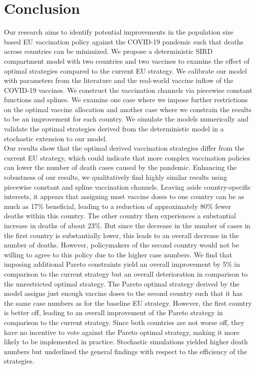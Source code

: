 \section{Conclusion}
Our research aims to identify potential improvements in the population size based EU vaccination policy against the COVID-19 pandemic such that deaths across countries can be minimized. We propose a deterministic SIRD compartment model with two countries and two vaccines to examine the effect of optimal strategies compared to the current EU strategy. We calibrate our model with parameters from the literature and the real-world vaccine inflow of the COVID-19 vaccines. We construct the vaccination channels via piecewise constant functions and splines. We examine one case where we impose further restrictions on the optimal vaccine allocation and another case where we constrain the results to be an improvement for each country. We simulate the models numerically and validate the optimal strategies derived from the deterministic model in a stochastic extension to our model.\\

Our results show that the optimal derived vaccination strategies differ from the current EU strategy, which could indicate that more complex vaccination policies can lower the number of death cases caused by the pandemic. Enhancing the robustness of our results, we qualitatively find highly similar results using piecewise constant and spline vaccination channels. Leaving aside country-specific interests, it appears that assigning most vaccine doses to one country can be as much as 17\% beneficial, leading to a reduction of approximately 80\% fewer deaths within this country. The other country then experiences a substantial increase in deaths of about 23\%. But since the decrease in the number of cases in the first country is substantially lower, this leads to an overall decrease in the number of deaths. However, policymakers of the second country would not be willing to agree to this policy due to the higher case numbers. We find that imposing additional Pareto constraints yield an overall improvement by 5\% in comparison to the current strategy but an overall deterioration in comparison to the unrestricted optimal strategy. The Pareto optimal strategy derived by the model assigns just enough vaccine doses to the second country such that it has the same case numbers as for the baseline EU strategy. However, the first country is better off, leading to an overall improvement of the Pareto strategy in comparison to the current strategy. Since both countries are not worse off, they have no incentive to vote against the Pareto optimal strategy, making it more likely to be implemented in practice. Stochastic simulations yielded higher death numbers but underlined the general findings with respect to the efficiency of the strategies.

